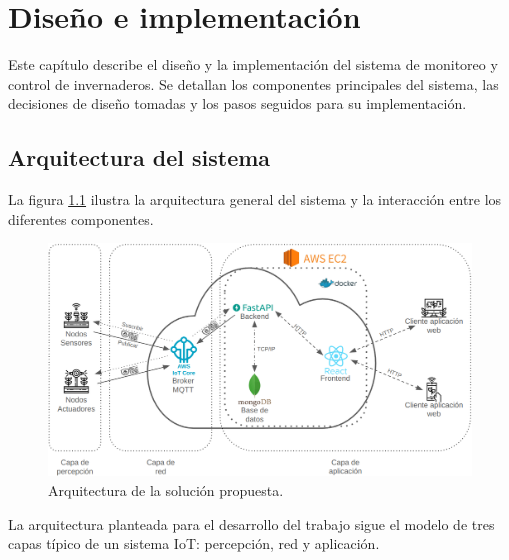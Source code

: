 
\chapter{Diseño e implementación} %

\label{Chapter3} %

Este capítulo describe el diseño y la implementación del sistema de monitoreo y
control de invernaderos. Se detallan los componentes principales del sistema,
las decisiones de diseño tomadas y los pasos seguidos para su implementación.

\section{Arquitectura del sistema}

La figura \ref{fig:arquitectura} ilustra la arquitectura general del sistema y
la interacción entre los diferentes componentes.

\begin{figure}[H]
    \centering
    \includegraphics[width=.99\textwidth]{./Images/14.png}
    \caption{Arquitectura de la solución propuesta.}
    \label{fig:arquitectura}
\end{figure}

La arquitectura planteada para el desarrollo del trabajo sigue el modelo de
tres capas típico de un sistema IoT: percepción, red y aplicación.

